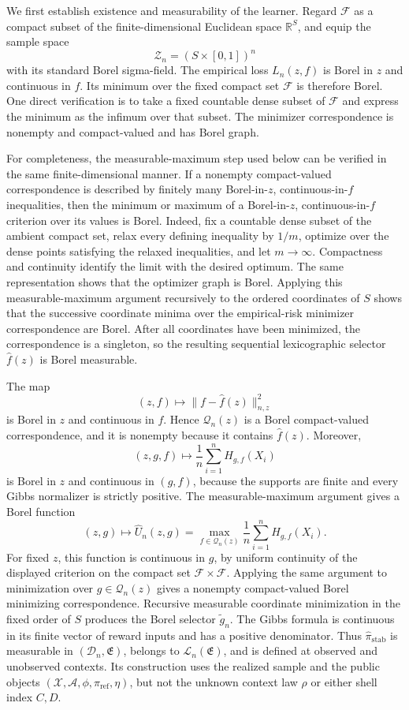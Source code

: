 We first establish existence and measurability of the learner. Regard \(\mathcal F\) as a compact subset of the finite-dimensional Euclidean space \(\mathbb R^S\), and equip the sample space
\[
\mathscr Z_n=(S\times[0,1])^n
\]
with its standard Borel sigma-field. The empirical loss \(L_n(z,f)\) is Borel in \(z\) and continuous in \(f\). Its minimum over the fixed compact set \(\mathcal F\) is therefore Borel. One direct verification is to take a fixed countable dense subset of \(\mathcal F\) and express the minimum as the infimum over that subset. The minimizer correspondence is nonempty and compact-valued and has Borel graph.

For completeness, the measurable-maximum step used below can be verified in the same finite-dimensional manner. If a nonempty compact-valued correspondence is described by finitely many Borel-in-\(z\), continuous-in-\(f\) inequalities, then the minimum or maximum of a Borel-in-\(z\), continuous-in-\(f\) criterion over its values is Borel. Indeed, fix a countable dense subset of the ambient compact set, relax every defining inequality by \(1/m\), optimize over the dense points satisfying the relaxed inequalities, and let \(m\to\infty\). Compactness and continuity identify the limit with the desired optimum. The same representation shows that the optimizer graph is Borel. Applying this measurable-maximum argument recursively to the ordered coordinates of \(S\) shows that the successive coordinate minima over the empirical-risk minimizer correspondence are Borel. After all coordinates have been minimized, the correspondence is a singleton, so the resulting sequential lexicographic selector \(\widehat f(z)\) is Borel measurable.

The map
\[
(z,f)\longmapsto
\|f-\widehat f(z)\|_{n,z}^2
\]
is Borel in \(z\) and continuous in \(f\). Hence \(\mathcal Q_n(z)\) is a Borel compact-valued correspondence, and it is nonempty because it contains \(\widehat f(z)\). Moreover,
\[
(z,g,f)\longmapsto
\frac1n\sum_{i=1}^nH_{g,f}(X_i)
\]
is Borel in \(z\) and continuous in \((g,f)\), because the supports are finite and every Gibbs normalizer is strictly positive. The measurable-maximum argument gives a Borel function
\[
(z,g)\longmapsto
\widehat U_n(z,g)
=\max_{f\in\mathcal Q_n(z)}
\frac1n\sum_{i=1}^nH_{g,f}(X_i).
\]
For fixed \(z\), this function is continuous in \(g\), by uniform continuity of the displayed criterion on the compact set \(\mathcal F\times\mathcal F\). Applying the same argument to minimization over \(g\in\mathcal Q_n(z)\) gives a nonempty compact-valued Borel minimizing correspondence. Recursive measurable coordinate minimization in the fixed order of \(S\) produces the Borel selector \(\widetilde g_n\). The Gibbs formula is continuous in its finite vector of reward inputs and has a positive denominator. Thus \(\widehat\pi_{\mathrm{stab}}\) is measurable in \((\mathcal D_n,\mathfrak E)\), belongs to \(\mathcal L_n(\mathfrak E)\), and is defined at observed and unobserved contexts. Its construction uses the realized sample and the public objects \((\mathcal X,\mathcal A,\phi,\pi_{\mathrm{ref}},\eta)\), but not the unknown context law \(\rho\) or either shell index \(C,D\).

